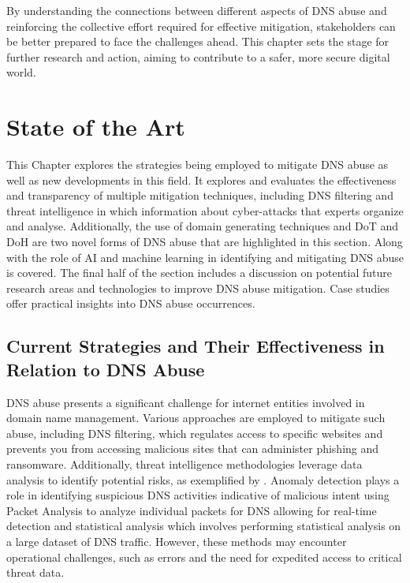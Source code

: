 By understanding the connections between different aspects of DNS abuse and reinforcing the collective effort required for effective mitigation, stakeholders can be better prepared to face the challenges ahead. This chapter sets the stage for further research and action, aiming to contribute to a safer, more secure digital world.

\chapter{State of the Art}

This Chapter explores the strategies being employed to mitigate DNS abuse as well as new developments in this field. It explores and evaluates the effectiveness and transparency of multiple mitigation techniques, including DNS filtering and threat intelligence in which information about cyber-attacks that experts organize and analyse. Additionally, the use of domain generating techniques and DoT and DoH are two novel forms of DNS abuse that are highlighted in this section. Along with the role of AI and machine learning in identifying and mitigating DNS abuse is covered. The final half of the section includes a discussion on potential future research areas and technologies to improve DNS abuse mitigation. Case studies offer practical insights into DNS abuse occurrences. 

\section{Current Strategies and Their Effectiveness in Relation to DNS Abuse}

DNS abuse presents a significant challenge for internet entities involved in domain name management. Various approaches are employed to mitigate such abuse, including DNS filtering, which regulates access to specific websites and prevents you from accessing malicious sites that can administer phishing and ransomware. Additionally, threat intelligence methodologies leverage data analysis to identify potential risks, as exemplified by \cite{schmid2021thirty}. Anomaly detection plays a role in identifying suspicious DNS activities indicative of malicious intent using Packet Analysis to analyze individual packets for DNS allowing for real-time detection and statistical analysis which involves performing statistical analysis on a large dataset of DNS traffic. However, these methods may encounter operational challenges, such as errors and the need for expedited access to critical threat data. 

